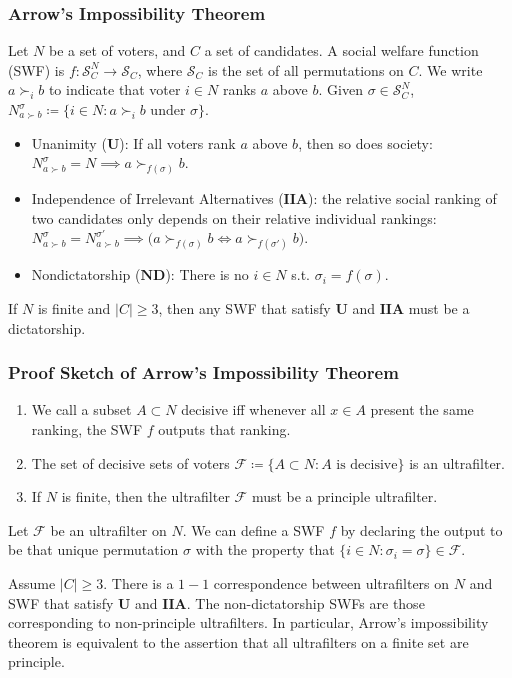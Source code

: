 \documentclass[UTF8,11pt,colorlinks,compress,openany]{beamer}%
\begin{document}
\begin{frame}\frametitle{Arrow's Impossibility Theorem}
Let $N$ be a set of voters, and $C$ a set of candidates. A social welfare function (SWF) is $f: \mathcal{S}_C^N\to \mathcal{S}_C$, where $\mathcal{S}_C$ is the set of all permutations on $C$. We write $a\succ_i b$ to indicate that voter $i\in N$ ranks $a$ above $b$. Given $\sigma\in \mathcal{S}_C^N$, $N_{a\succ b}^{\sigma}\coloneqq \{i\in N: a\succ_i b \mbox{ under } \sigma\}$.
\begin{itemize}
	\item Unanimity ($\mathbf{U}$): If all voters rank $a$ above $b$, then so does society: $N_{a\succ b}^{\sigma}=N\implies a\succ_{f(\sigma)}b$.
	\item Independence of Irrelevant Alternatives ($\mathbf{IIA}$): the relative social ranking of two candidates only depends on their relative individual rankings: $N_{a\succ b}^{\sigma}=N_{a\succ b}^{\sigma'}\implies \Big(a\succ_{f(\sigma)}b\iff a\succ_{f(\sigma')}b\Big)$.
	\item Nondictatorship ($\mathbf{ND}$): There is no $i\in N$ s.t. $\sigma_i=f(\sigma)$.
\end{itemize}
\begin{theorem}
If $N$ is finite and $|C|\geq 3$, then any SWF that satisfy $\mathbf{U}$ and $\mathbf{IIA}$ must be a dictatorship.
\end{theorem}
\end{frame}

\begin{frame}\frametitle{Proof Sketch of Arrow's Impossibility Theorem}
\begin{enumerate}
	\item We call a subset $A\subset N$ decisive iff whenever all $x\in A$ present the same ranking, the SWF $f$ outputs that ranking.
	\item The set of decisive sets of voters $\mathcal{F}\coloneqq \{A\subset N: A \mbox{ is decisive}\}$ is an ultrafilter.
	\item If $N$ is finite, then the ultrafilter $\mathcal{F}$ must be a principle ultrafilter.
\end{enumerate}
Let $\mathcal{F}$ be an ultrafilter on $N$. We can define a SWF $f$ by declaring the output to be that unique permutation $\sigma$ with the property that $\{i\in N: \sigma_i=\sigma\}\in \mathcal{F}$.
\begin{theorem}
Assume $|C|\geq 3$. There is a $1-1$ correspondence between ultrafilters on $N$ and SWF that satisfy $\mathbf{U}$ and $\mathbf{IIA}$. The non-dictatorship SWFs are those corresponding to non-principle ultrafilters. In particular, Arrow's impossibility theorem is equivalent to the assertion that all ultrafilters on a finite set are principle.
\end{theorem}
\end{frame}
\end{document}
